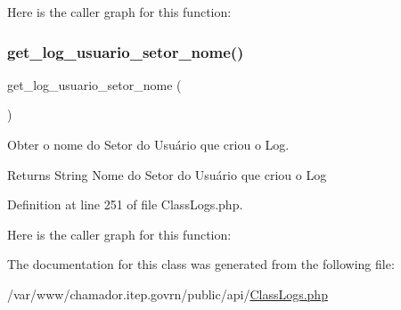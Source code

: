 Here is the caller graph for this function\+:
\mbox{\label{class_class_logs_ac914a1afc0bfd651798dace25249610c}} 
\subsubsection{\texorpdfstring{get\+\_\+log\+\_\+usuario\+\_\+setor\+\_\+nome()}{get\_log\_usuario\_setor\_nome()}}
{\footnotesize\ttfamily get\+\_\+log\+\_\+usuario\+\_\+setor\+\_\+nome (\begin{DoxyParamCaption}{ }\end{DoxyParamCaption})}



Obter o nome do Setor do Usuário que criou o Log. 

\begin{DoxyReturn}{Returns}
String Nome do Setor do Usuário que criou o Log 
\end{DoxyReturn}


Definition at line 251 of file Class\+Logs.\+php.

Here is the caller graph for this function\+:


The documentation for this class was generated from the following file\+:\begin{DoxyCompactItemize}
\item 
/var/www/chamador.\+itep.\+govrn/public/api/\hyperlink{_class_logs_8php}{Class\+Logs.\+php}\end{DoxyCompactItemize}
